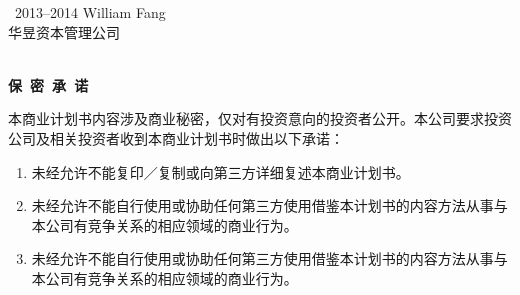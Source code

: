 \thispagestyle{empty}

\noindent\textcopyright\ 2013--2014 William Fang\\
{\kai 华昱资本管理公司} {\lmr\textregistered}\\[-2em]
\ \\

\begin{center}
\LARGE\enspace\bfseries{\color{themecolor} 保\ 密\ 承\ 诺} \\
\base{}
\end{center}



本商业计划书内容涉及商业秘密，仅对有投资意向的投资者公开。本公司要求投资公司及相关投资者收到本商业计划书时做出以下承诺：

\begin{enumerate}
\item 未经允许不能复印／复制或向第三方详细复述本商业计划书。
\item 未经允许不能自行使用或协助任何第三方使用借鉴本计划书的内容方法从事与本公司有竞争关系的相应领域的商业行为。
\item 未经允许不能自行使用或协助任何第三方使用借鉴本计划书的内容方法从事与本公司有竞争关系的相应领域的商业行为。
\end{enumerate}

